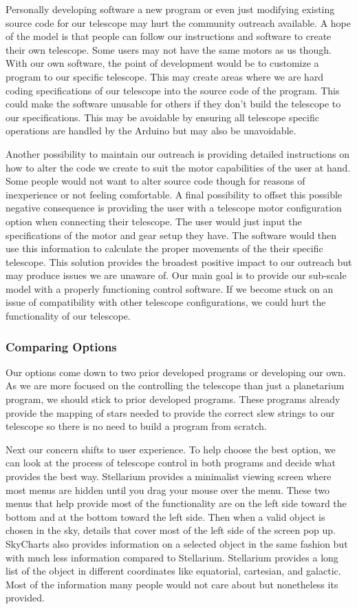 \documentclass[12pt]{article}
\begin{document}
Personally developing software a new program or even just modifying existing source code for our telescope may hurt the community outreach available. A hope of the model is that people can follow our instructions and software to create their own telescope. Some users may not have the same motors as us though. With our own software, the point of development would be to customize a program to our specific telescope. This may create areas where we are hard coding specifications of our telescope into the source code of the program. This could make the software unusable for others if they don’t build the telescope to our specifications. This may be avoidable by ensuring all telescope specific operations are handled by the Arduino but may also be unavoidable.

Another possibility to maintain our outreach is providing detailed instructions on how to alter the code we create to suit the motor capabilities of the user at hand. Some people would not want to alter source code though for reasons of inexperience or not feeling comfortable. A final possibility to offset this possible negative consequence is providing the user with a telescope motor configuration option when connecting their telescope. The user would just input the specifications of the motor and gear setup they have. The software would then use this information to calculate the proper movements of the their specific telescope. This solution provides the broadest positive impact to our outreach but may produce issues we are unaware of. Our main goal is to provide our sub-scale model with a properly functioning control software. If we become stuck on an issue of compatibility with other telescope configurations, we could hurt the functionality of our telescope.

\subsubsection{Comparing Options}

Our options come down to two prior developed programs or developing our own. As we are more focused on the controlling the telescope than just a planetarium program, we should stick to prior developed programs. These programs already provide the mapping of stars needed to provide the correct slew strings to our telescope so there is no need to build a program from scratch.

Next our concern shifts to user experience. To help choose the best option, we can look at the process of telescope control in both programs and decide what provides the best way. Stellarium provides a minimalist viewing screen where most menus are hidden until you drag your mouse over the menu. These two menus that help provide most of the functionality are on the left side toward the bottom and at the bottom toward the left side. Then when a valid object is chosen in the sky, details that cover most of the left side of the screen pop up. SkyCharts also provides information on a selected object in the same fashion but with much less information compared to Stellarium. Stellarium provides a long list of the object in different coordinates like equatorial, cartesian, and galactic. Most of the information many people would not care about but nonetheless its provided.
\end{document}
